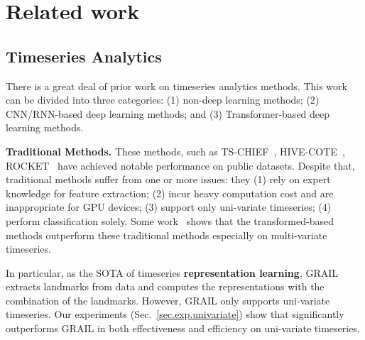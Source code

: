 \section{Related work}
\label{sec.related}


\subsection{Timeseries Analytics}
There is a great deal of prior work on timeseries analytics methods. This work can be divided into three categories: (1) non-deep learning methods; (2) CNN/RNN-based deep learning methods; and (3) Transformer-based deep learning methods.

\noindent\textbf{Traditional Methods.} 
These methods, such as TS-CHIEF~\cite{Shifaz2020TSCHIEFAS}, HIVE-COTE~\cite{10.1145/3182382},  ROCKET~\cite{DBLP:journals/datamine/DempsterPW20} have achieved notable performance on public datasets. Despite that, traditional methods suffer from one or more issues: they (1) rely on expert knowledge for feature extraction;
(2) incur heavy computation cost and are inappropriate for GPU devices; (3) support only uni-variate timeseries; (4) perform classification solely. 
Some work~\cite{DBLP:conf/kdd/ZerveasJPBE21} shows that the transformed-based methods outperform these traditional methods especially on multi-variate timeseries. 


In particular, as the SOTA of timeseries {\bf representation learning}, GRAIL~\cite{paparrizos2019grail} extracts landmarks from data and computes the representations with the combination of the landmarks. However, GRAIL only supports uni-variate timeseries. Our experiments (Sec.~\ref{sec.exp.univariate}) show that \system significantly outperforms GRAIL in both effectiveness and efficiency on uni-variate timeseries.



